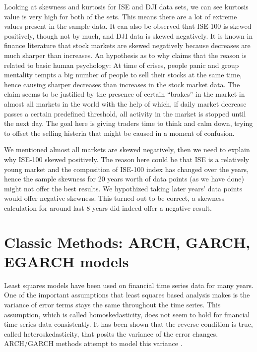Looking at skewness and kurtosis for ISE and DJI data sets, we can see kurtosis
value is very high for both of the sets. This means there are a lot of extreme
values present in the sample data. It can also be observed that ISE-100 is
skewed positively, though not by much, and DJI data is skewed negatively. It is
known in finance literature that stock markets are skewed negatively because
decreases are much sharper than increases. An hypothesis as to why claims that
the reason is related to basic human psychology: At time of crises, people panic
and group mentality tempts a big number of people to sell their stocks at the
same time, hence causing sharper decreases than increases in the stock market
data. The claim seems to be justified by the presence of certain ``brakes'' in
the market in almost all markets in the world with the help of which, if daily
market decrease passes a certain predefined threshold, all activity in the
market is stopped until the next day. The goal here is giving traders time to
think and calm down, trying to offset the selling histeria that might be caused
in a moment of confusion. 

We mentioned almost all markets are skewed negatively, then we need to explain
why ISE-100 skewed positively. The reason here could be that ISE is a relatively
young market and the composition of ISE-100 index has changed over the years,
hence the sample skewness for 20 years worth of data points (as we have done)
might not offer the best results. We hypothized taking later years' data points
would offer negative skewness. This turned out to be correct, a skewness
calculation for around last 8 years did indeed offer a negative result.

\section{Classic Methods: ARCH, GARCH, EGARCH models} 

Least squares models have been used on financial time series data for many
years. One of the important assumptions that least squares based analysis makes
is the variance of error terms stays the same throughout the time series. This
assumption, which is called homoskedasticity, does not seem to hold for
financial time series data consistently. It has been shown that the reverse
condition is true, called heteroskedasticity, that posits the variance of the
error changes. ARCH/GARCH methods attempt to model this variance \cite{engle}.

